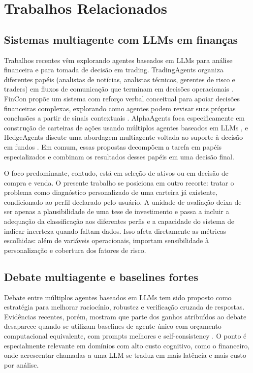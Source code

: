 \section{Trabalhos Relacionados}

\subsection{Sistemas multiagente com LLMs em finanças}

Trabalhos recentes vêm explorando agentes baseados em LLMs para análise
financeira e para tomada de decisão em trading. TradingAgents organiza
diferentes papéis (analistas de notícias, analistas técnicos, gerentes de
risco e traders) em fluxos de comunicação que terminam em decisões
operacionais \citep{tradingagents2024}. FinCon propõe um sistema com
reforço verbal conceitual para apoiar decisões financeiras complexas,
explorando como agentes podem revisar suas próprias conclusões a partir de
sinais contextuais \citep{fincon2024}. AlphaAgents foca especificamente em
construção de carteiras de ações usando múltiplos agentes baseados em LLMs
\citep{alphaagents2025}, e HedgeAgents discute uma abordagem multiagente
voltada ao suporte à decisão em fundos \citep{hedgeagents2025}. Em comum,
essas propostas decompõem a tarefa em papéis especializados e combinam os
resultados desses papéis em uma decisão final.

O foco predominante, contudo, está em seleção de ativos ou em decisão de
compra e venda. O presente trabalho se posiciona em outro recorte: tratar o
problema como diagnóstico personalizado de uma carteira já existente,
condicionado ao perfil declarado pelo usuário. A unidade de avaliação
deixa de ser apenas a plausibilidade de uma tese de investimento e passa
a incluir a adequação da classificação aos diferentes perfis e a
capacidade do sistema de indicar incerteza quando faltam dados. Isso
afeta diretamente as métricas escolhidas: além de variáveis operacionais,
importam sensibilidade à personalização e cobertura dos fatores de risco.

\subsection{Debate multiagente e baselines fortes}

Debate entre múltiplos agentes baseados em LLMs tem sido proposto como
estratégia para melhorar raciocínio, robustez e verificação cruzada de
respostas. Evidências recentes, porém, mostram que parte dos ganhos
atribuídos ao debate desaparece quando se utilizam baselines de agente
único com orçamento computacional equivalente, com prompts melhores e
self-consistency \citep{zhang2025stop}. O ponto é especialmente relevante
em domínios com alto custo cognitivo, como o financeiro, onde acrescentar
chamadas a uma LLM se traduz em mais latência e mais custo por análise.

